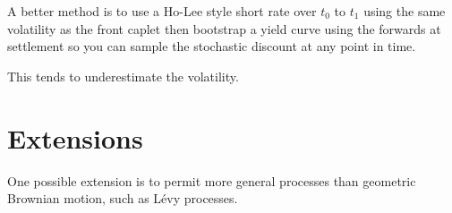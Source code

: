 A better method is to use a Ho-Lee style short rate over $t_0$
to $t_1$ using the same volatility as the front caplet then
bootstrap a yield curve using the forwards at settlement so you
can sample the stochastic discount at any point in time.

This tends to underestimate the volatility.

\section{Extensions}
One possible extension is to permit more general processes than
geometric Brownian motion, such as L\'evy processes.
